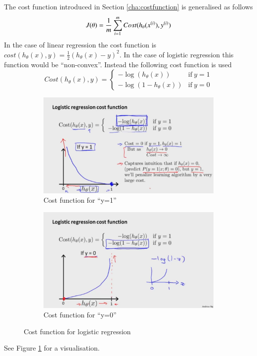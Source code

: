 \documentclass[a4paper,twoside,10pt]{article}
\begin{document}
The cost function introduced in Section \ref{cha:costfunction} is generalised as follows
\begin{equation*}
  J(\theta)=\frac{1}{m}\displaystyle\sum_{i=1}^m Cost(h_\theta(x^{(i)}),y^{(i)})
\end{equation*}
In the case of linear regression the cost function is $cost(h_\theta(x),y)=\frac{1}{2}(h_\theta(x)-y)^2$.
In the case of logistic regression this function would be ``non-convex''. Instead the following cost function is used
\begin{equation*}
Cost(h_\theta(x),y)=
\left\{\begin{array}{rl}-\operatorname{log}(h_\theta(x))&\mathrm{if\ }y=1\\
-\operatorname{log}(1-h_\theta(x))&\mathrm{if\ }y=0\end{array}\right.
\end{equation*}
\begin{figure}[htbp]
  \begin{center}
    \begin{subfigure}[b]{.47\textwidth}
      \includegraphics[width=\linewidth]{costy1}
      \caption{Cost function for ``y=1''}
    \end{subfigure}
    \begin{subfigure}[b]{.47\textwidth}
      \includegraphics[width=\linewidth]{costy0}
      \caption{Cost function for ``y=0''}
    \end{subfigure}
    \caption{Cost function for logistic regression\label{fig:costlog}}
  \end{center}
\end{figure}
See Figure \ref{fig:costlog} for a visualisation.
\end{document}
